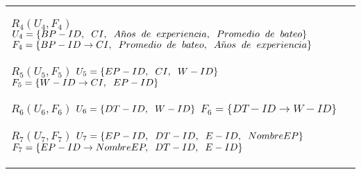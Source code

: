 \documentclass{report}
\begin{document}
\begin{tabularx}{\textwidth}{|X|}
        $ R_{4} ( U_{4} , F_{4} ) $ \newline 
        $ U_{4} = \{{BP-ID, \hspace{0.2cm} CI, \hspace{0.2cm}  A\tilde{n}os \hspace{0.2cm} de \hspace{0.2cm} experiencia, \hspace{0.2cm}  Promedio \hspace{0.2cm} de \hspace{0.2cm} bateo}\} $ \newline 
        $ F_{4} = \{BP-ID \rightarrow CI, \hspace{0.2cm} Promedio \hspace{0.2cm} de \hspace{0.2cm} bateo, \hspace{0.2cm} A\tilde{n}os \hspace{0.2cm} de \hspace{0.2cm} experiencia \} $\newline 
        
        $ R_{5} ( U_{5} , F_{5} ) $ \newline 
        $ U_{5} = \{{EP-ID, \hspace{0.2cm}  CI, \hspace{0.2cm}  W-ID}\} $ \newline 
        $ F_{5} = \{W-ID \rightarrow CI, \hspace{0.2cm} EP-ID \} $\newline 
        
        $ R_{6} ( U_{6} , F_{6} ) $ \newline 
        $ U_{6} = \{{DT-ID, \hspace{0.2cm}  W-ID}\} $ \newline 
        $ F_{6} = \{DT-ID \rightarrow W-ID \} $\newline 
        
        $ R_{7} ( U_{7} , F_{7} ) $ \newline 
        $ U_{7} = \{{EP-ID, \hspace{0.2cm}  DT-ID, \hspace{0.2cm}  E-ID, \hspace{0.2cm}  NombreEP}\} $ \newline 
        $ F_{7} = \{EP-ID \rightarrow NombreEP, \hspace{0.2cm} DT-ID, \hspace{0.2cm} E-ID \} $\newline 
        

\end{tabularx}
\end{document}
